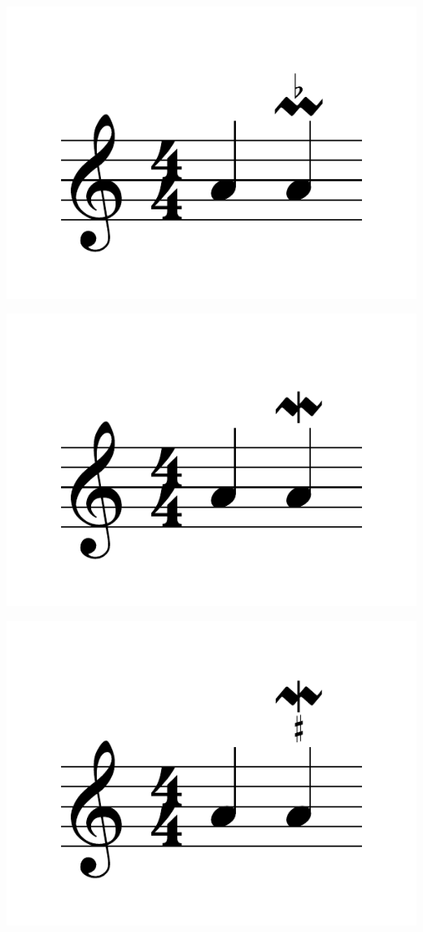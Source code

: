 \documentclass{article}
\begin{document}
\includegraphics[scale=0.5]{figures_tests/pdf/skern/ornaments4.pdf}

\includegraphics[scale=0.5]{figures_tests/pdf/skern/ornaments5.pdf}

\includegraphics[scale=0.5]{figures_tests/pdf/skern/ornaments6.pdf}
\end{document}
